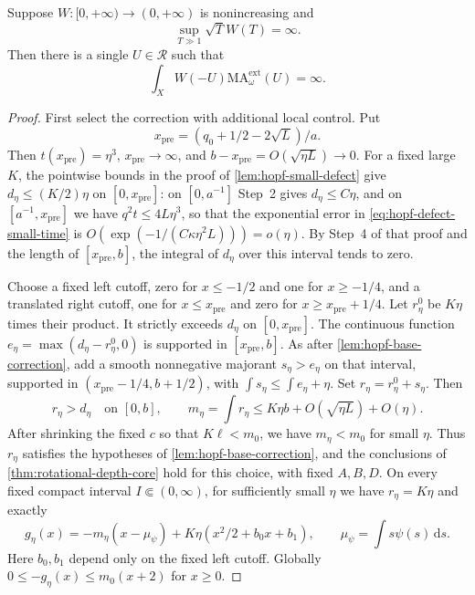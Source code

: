 \begin{theorem}\label{thm:rotational-infinite-weighted-measure}
Suppose $W\colon[0,+\infty)\to(0,+\infty)$ is nonincreasing and
\[
 \sup_{T\gg1}\sqrt T W(T)=\infty.
\]
Then there is a single $U\in\mathcal R$ such that
\[
 \int_XW(-U)\mathrm{MA}^{\mathrm{ext}}_\omega(U)=\infty.
\]
\end{theorem}
\begin{proof}
First select the correction with additional local control. Put
\[
 x_{\mathrm{pre}}=(q_0+1/2-2\sqrt L)/a.
\]
Then $t(x_{\mathrm{pre}})=\eta^3$, $x_{\mathrm{pre}}\to\infty$, and
$b-x_{\mathrm{pre}}=O(\sqrt{\eta L})\to0$.
For a fixed large $K$, the pointwise bounds in the proof of \cref{lem:hopf-small-defect} give
$d_\eta\leq(K/2)\eta$ on $[0,x_{\mathrm{pre}}]$:
on $[0,a^{-1}]$ Step~2 gives $d_\eta\leq C\eta$, and on $[a^{-1},x_{\mathrm{pre}}]$ we have $q^2t\leq4L\eta^3$, so that the exponential error in \eqref{eq:hopf-defect-small-time} is
$O(\exp(-1/(C\kappa\eta^2L)))=o(\eta)$.
By Step~4 of that proof and the length of $[x_{\mathrm{pre}},b]$, the integral of $d_\eta$ over this interval tends to zero.

Choose a fixed left cutoff, zero for $x\leq-1/2$ and one for $x\geq-1/4$,
and a translated right cutoff, one for $x\leq x_{\mathrm{pre}}$ and zero for
$x\geq x_{\mathrm{pre}}+1/4$.
Let $r^0_\eta$ be $K\eta$ times their product. It strictly exceeds $d_\eta$
on $[0,x_{\mathrm{pre}}]$. The continuous function
$e_\eta=\max(d_\eta-r^0_\eta,0)$ is supported in $[x_{\mathrm{pre}},b]$.
As after \cref{lem:hopf-base-correction}, add a smooth nonnegative majorant $s_\eta>e_\eta$ on that interval,
supported in $(x_{\mathrm{pre}}-1/4,b+1/2)$, with
$\int s_\eta\leq\int e_\eta+\eta$.
Set $r_\eta=r^0_\eta+s_\eta$. Then
\[
 r_\eta>d_\eta\quad\text{on }[0,b],\qquad
 m_\eta=\int r_\eta\leq K\eta b+O(\sqrt{\eta L})+O(\eta).
\]
After shrinking the fixed $c$ so that $K\ell<m_0$, we have $m_\eta<m_0$ for small $\eta$. Thus $r_\eta$ satisfies the hypotheses of \cref{lem:hopf-base-correction}, and the conclusions of \cref{thm:rotational-depth-core} hold for this choice, with fixed $A,B,D$.
On every fixed compact interval $I\Subset(0,\infty)$, for sufficiently small
$\eta$ we have $r_\eta=K\eta$ and exactly
\begin{equation}\label{eq:rotational-controlled-correction}
 g_\eta(x)=-m_\eta(x-\mu_\psi)
              +K\eta(x^2/2+b_0x+b_1),\qquad
 \mu_\psi=\int s\psi(s)\,\mathrm ds.
\end{equation}
Here $b_0,b_1$ depend only on the fixed left cutoff.
Globally $0\leq-g_\eta(x)\leq m_0(x+2)$ for $x\geq0$.


\end{proof}
